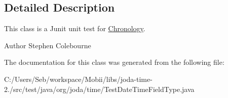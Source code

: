 \subsection{Detailed Description}
This class is a Junit unit test for \hyperlink{classorg_1_1joda_1_1time_1_1_chronology}{Chronology}.

\begin{DoxyAuthor}{Author}
Stephen Colebourne 
\end{DoxyAuthor}


The documentation for this class was generated from the following file\-:\begin{DoxyCompactItemize}
\item 
C\-:/\-Users/\-Seb/workspace/\-Mobii/libs/joda-\/time-\/2./src/test/java/org/joda/time/Test\-Date\-Time\-Field\-Type.\-java\end{DoxyCompactItemize}
